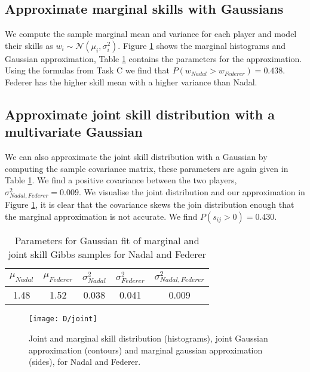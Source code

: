 \documentclass[11pt]{article}
\begin{document}
\subsection{Approximate marginal skills with Gaussians}
We compute the sample marginal mean and variance for each player and model their skills as $w_i \sim \mathcal{N}(\mu_i, \sigma_i^2)$. Figure \ref{fig:D_joint} shows the marginal histograms and Gaussian approximation, Table \ref{tbl:D_gibbs_parameters} contains the parameters for the approximation. Using the formulas from Task C we find that $P(w_{Nadal} > w_{Federer}) = 0.438$. Federer has the higher skill mean with a higher variance than Nadal.

\subsection{Approximate joint skill distribution with a multivariate Gaussian}
We can also approximate the joint skill distribution with a Gaussian by computing the sample covariance matrix, these parameters are again given in Table \ref{tbl:D_gibbs_parameters}. We find a positive covariance between the two players, $\sigma_{Nadal, Federer}^2 = 0.009$. We visualise the joint distribution and our approximation in Figure \ref{fig:D_joint}, it is clear that the covariance skews the join distribution enough that the marginal approximation is not accurate. We find $P(s_{ij}>0) = 0.430$.

\begin{table}
    \centering
    \small
    \begin{tabular}{|c|c|c|c|c|}
        \hline
        $\mu_{Nadal}$ & $\mu_{Federer}$ & $\sigma_{Nadal}^2$ & $\sigma_{Federer}^2$ & $\sigma_{Nadal, Federer}^2$ \\
        \hline
        1.48 & 1.52 & 0.038 & 0.041 & 0.009 \\
        \hline
    \end{tabular}
    \caption{Parameters for Gaussian fit of marginal and joint skill Gibbs samples for Nadal and Federer}
    \label{tbl:D_gibbs_parameters}
\end{table}

\begin{figure}
    \centering
    \texttt{[image: D/joint]}
    \caption{Joint and marginal skill distribution (histograms), joint Gaussian approximation (contours) and marginal gaussian approximation (sides), for Nadal and Federer.}
    \label{fig:D_joint}
\end{figure}
\end{document}

